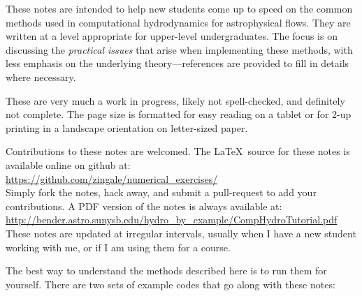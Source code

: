 

These notes are intended to help new students come up to speed on the
common methods used in computational hydrodynamics for astrophysical
flows.  They are written at a level appropriate for upper-level
undergraduates.  The focus is on discussing the {\em practical issues}
that arise when implementing these methods, with less emphasis on the
underlying theory---references are provided to fill in details where
necessary.

These are very much a work in progress, likely not spell-checked, and
definitely not complete.  The page size is formatted for easy reading
on a tablet or for 2-up printing in a landscape orientation on
letter-sized paper.  

Contributions to these notes are welcomed.  The \LaTeX\ source
for these notes is available online on github at: \\[0.25em]
%
\url{https://github.com/zingale/numerical_exercises/} \\[0.25em]
%
Simply fork the notes, hack away, and submit a pull-request to add
your contributions.  A PDF version of the notes is always available
at: \\[0.25em]
%
\url{http://bender.astro.sunysb.edu/hydro_by_example/CompHydroTutorial.pdf} \\[0.25em]
%
These notes are updated at irregular intervals, usually when I have a
new student working with me, or if I am using them for a course.

The best way to understand the methods described here is to run
them for yourself.  There are two sets of example codes that
go along with these notes:

